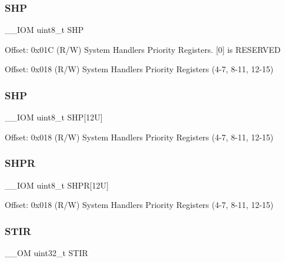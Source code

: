 \subsubsection{\texorpdfstring{S\+HP}{SHP}\hspace{0.1cm}{\footnotesize\ttfamily [1/2]}}
{\footnotesize\ttfamily \+\_\+\+\_\+\+I\+OM uint8\+\_\+t S\+HP}

Offset\+: 0x01C (R/W) System Handlers Priority Registers. \mbox{[}0\mbox{]} is R\+E\+S\+E\+R\+V\+ED

Offset\+: 0x018 (R/W) System Handlers Priority Registers (4-\/7, 8-\/11, 12-\/15) \mbox{\label{struct_s_c_b___type_a293826a2c44f754e80af03d62f62f9e6}} 
\subsubsection{\texorpdfstring{S\+HP}{SHP}\hspace{0.1cm}{\footnotesize\ttfamily [2/2]}}
{\footnotesize\ttfamily \+\_\+\+\_\+\+I\+OM uint8\+\_\+t S\+HP\mbox{[}12\+U\mbox{]}}

Offset\+: 0x018 (R/W) System Handlers Priority Registers (4-\/7, 8-\/11, 12-\/15) \mbox{\label{struct_s_c_b___type_a49f5a554705aebf542765b3a38f4feb9}} 
\subsubsection{\texorpdfstring{S\+H\+PR}{SHPR}}
{\footnotesize\ttfamily \+\_\+\+\_\+\+I\+OM uint8\+\_\+t S\+H\+PR\mbox{[}12\+U\mbox{]}}

Offset\+: 0x018 (R/W) System Handlers Priority Registers (4-\/7, 8-\/11, 12-\/15) \mbox{\label{struct_s_c_b___type_ada9cbba14ab1cc3fddd585f870932db8}} 
\subsubsection{\texorpdfstring{S\+T\+IR}{STIR}}
{\footnotesize\ttfamily \+\_\+\+\_\+\+OM uint32\+\_\+t S\+T\+IR}


